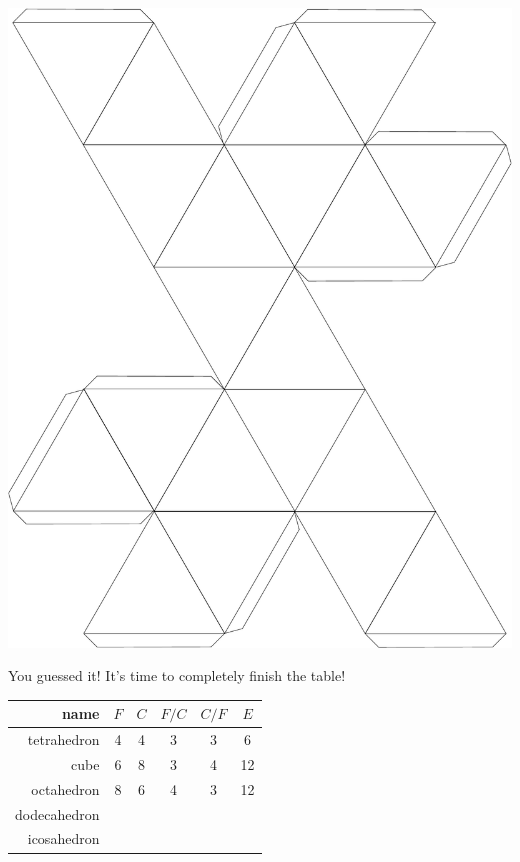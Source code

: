 \centerline{\includegraphics[scale=.5]{images/icosahedron_template.pdf}}
\bigskip

\newpage

You guessed it! It's time to completely finish the table!
\bigskip


\setlength{\tabcolsep}{18pt}
\begin{tabular}{r|c|c|c|c|c} 
\bigstrut name        & $F$ & $C$ & $F/C$ & $C/F$ & $E$ \\ \hline
\bigstrut tetrahedron & 4   & 4   & 3     & 3     & 6  \\ \hline
\bigstrut cube        & 6   & 8   & 3     & 4     & 12 \\ \hline
\bigstrut octahedron  & 8   & 6   & 4     & 3     & 12 \\ \hline
\bigstrut dodecahedron&     &     &       &       &    \\ \hline
\bigstrut icosahedron &     &     &       &       &    \\ \hline
\end{tabular}
\bigskip

